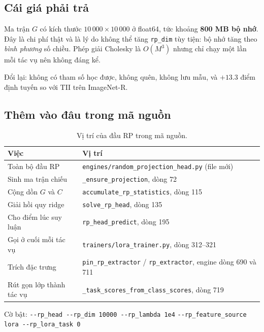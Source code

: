 \documentclass[11pt,a4paper]{article}
\begin{document}
\subsection{Cái giá phải trả}

Ma trận $G$ có kích thước $10\,000 \times 10\,000$ ở float64, tức khoảng
\textbf{800 MB bộ nhớ}. Đây là chi phí thật và là lý do không thể tăng
\texttt{rp\_dim} tùy tiện: bộ nhớ tăng theo \emph{bình phương} số chiều. Phép
giải Cholesky là $O(M^3)$ nhưng chỉ chạy một lần mỗi tác vụ nên không đáng kể.

Đổi lại: không có tham số học được, không quên, không lưu mẫu, và $+13.3$ điểm
định tuyến so với TII trên ImageNet-R.

\subsection{Thêm vào đâu trong mã nguồn}

\begin{table}[htbp]
\centering
\caption{Vị trí của đầu RP trong mã nguồn.}
\begin{tabular}{lL}
\toprule
Việc & Vị trí \\
\midrule
Toàn bộ đầu RP        & \texttt{engines/random\_projection\_head.py} (file mới) \\
Sinh ma trận chiếu    & \texttt{\_ensure\_projection}, dòng 72 \\
Cộng dồn $G$ và $C$   & \texttt{accumulate\_rp\_statistics}, dòng 115 \\
Giải hồi quy ridge    & \texttt{solve\_rp\_head}, dòng 135 \\
Cho điểm lúc suy luận & \texttt{rp\_head\_predict}, dòng 195 \\
Gọi ở cuối mỗi tác vụ & \texttt{trainers/lora\_trainer.py}, dòng 312--321 \\
Trích đặc trưng       & \texttt{pin\_rp\_extractor} / \texttt{rp\_extractor},
                        engine dòng 690 và 711 \\
Rút gọn lớp thành tác vụ
                      & \texttt{\_task\_scores\_from\_class\_scores}, dòng 719 \\
\bottomrule
\end{tabular}
\end{table}

\noindent Cờ bật:
\texttt{-{}-rp\_head -{}-rp\_dim 10000 -{}-rp\_lambda 1e4}
\texttt{-{}-rp\_feature\_source lora -{}-rp\_lora\_task 0}

\end{document}
